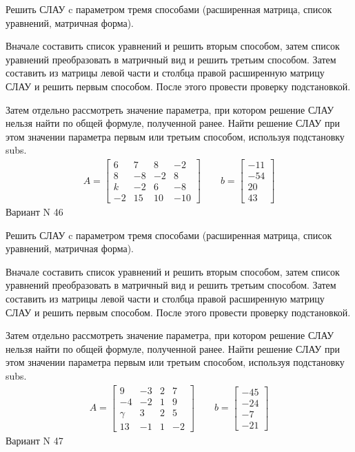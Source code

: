 \documentclass[11pt]{report}
\begin{document}
Решить СЛАУ c параметром тремя способами (расширенная матрица, список уравнений, матричная форма).

Вначале составить список уравнений и решить вторым способом,
затем список уравнений преобразовать в матричный вид и решить третьим способом.
Затем составить из матрицы левой части и столбца правой расширенную матрицу СЛАУ и решить первым способом.
После этого провести проверку подстановкой.

Затем отдельно рассмотреть значение параметра, при котором решение СЛАУ нельзя найти по общей формуле,
полученной ранее.
Найти решение СЛАУ при этом значении параметра первым или третьим способом, используя подстановку subs.
\begin{align*}
    A = \left[\begin{matrix}6 & 7 & 8 & -2\\8 & -8 & -2 & 8\\k & -2 & 6 & -8\\-2 & 15 & 10 & -10\end{matrix}\right]
\qquad b = \left[\begin{matrix}-11\\-54\\20\\43\end{matrix}\right]
\end{align*}
\newpage
Вариант N 46


Решить СЛАУ c параметром тремя способами (расширенная матрица, список уравнений, матричная форма).

Вначале составить список уравнений и решить вторым способом,
затем список уравнений преобразовать в матричный вид и решить третьим способом.
Затем составить из матрицы левой части и столбца правой расширенную матрицу СЛАУ и решить первым способом.
После этого провести проверку подстановкой.

Затем отдельно рассмотреть значение параметра, при котором решение СЛАУ нельзя найти по общей формуле,
полученной ранее.
Найти решение СЛАУ при этом значении параметра первым или третьим способом, используя подстановку subs.
\begin{align*}
    A = \left[\begin{matrix}9 & -3 & 2 & 7\\-4 & -2 & 1 & 9\\\gamma & 3 & 2 & 5\\13 & -1 & 1 & -2\end{matrix}\right]
\qquad b = \left[\begin{matrix}-45\\-24\\-7\\-21\end{matrix}\right]
\end{align*}
\newpage
Вариант N 47
\end{document}
